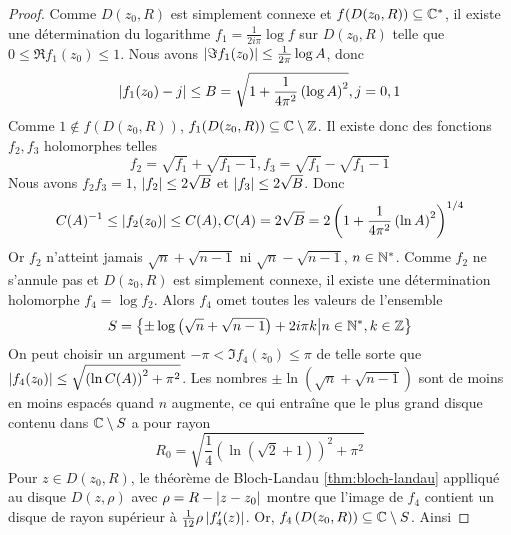 \documentclass{cours}
\begin{document}
\begin{proof}
	Comme $D(z_{0}, R)$ est simplement connexe et $f(D(z_{0}, R)) \subseteq \mathbb{C}^{*}$, il existe une détermination du logarithme $f_{1} = \frac{1}{2i\pi}\log f$ sur $D(z_{0}, R)$ telle que $0 \leq \Re f_{1}(z_{0}) \leq 1$. 
	Nous avons $\left|\Im f_{1}(z_{0})\right| \leq \frac{1}{2\pi}\log A$, donc
	\begin{equation*}
		\left|f_{1}(z_{0}) - j\right| \leq B = \sqrt{1 + \frac{1}{4\pi^{2}}\left(\log A\right)^{2}}, j = 0, 1
	\end{equation*}
	Comme $1 \notin f(D(z_{0}, R))$, $f_{1}(D(z_{0}, R)) \subseteq \mathbb{C} \setminus \mathbb{Z}$. 
	Il existe donc des fonctions $f_{2}, f_{3}$ holomorphes telles
	\begin{equation*}
		f_{2} = \sqrt{f_{1}} + \sqrt{f_{1} - 1}, f_{3} = \sqrt{f_{1}} - \sqrt{f_{1}-1}
	\end{equation*}
	Nous avons $f_{2}f_{3} = 1$, $\left|f_{2}\right|\leq 2\sqrt{B}$ et $\left|f_{3}\right|\leq 2\sqrt{B}$. Donc
	\begin{equation*}
		C(A)^{-1} \leq \left|f_{2}(z_{0})\right| \leq C(A), C(A) = 2\sqrt{B} = 2\left(1 + \frac{1}{4\pi^{2}}\left(\ln A\right)^{2}\right)^{1/4}
	\end{equation*}
	Or $f_{2}$ n'atteint jamais $\sqrt{n} + \sqrt{n - 1}$ ni $\sqrt{n} - \sqrt{n - 1}$, $n \in \mathbb{N}^{*}$. 
	Comme $f_{2}$ ne s'annule pas et $D(z_{0}, R)$ est simplement connexe, il existe une détermination holomorphe $f_{4} = \log f_{2}$.
	Alors $f_{4}$ omet toutes les valeurs de l'ensemble 
	\begin{equation*}
		S = \left\{\pm \log\left(\sqrt{n} + \sqrt{n - 1}\right) + 2i\pi k\middle| n \in \mathbb{N}^{*}, k \in \mathbb{Z}\right\}
	\end{equation*}
	On peut choisir un argument $-\pi < \Im f_{4}(z_{0}) \leq \pi$ de telle sorte que $\left|f_{4}(z_{0})\right| \leq\sqrt{\left(\ln C(A)\right)^{2} + \pi^{2}}$.
	Les nombres $\pm \ln\left(\sqrt{n} + \sqrt{n - 1}\right)$ sont de moins en moins espacés quand $n$ augmente, ce qui entraîne que le plus grand disque contenu dans $\mathbb{C} \setminus S$ a pour rayon
	\begin{equation*}
		R_{0} = \sqrt{\frac{1}{4}\left(\ln(\sqrt{2} + 1)\right)^{2} + \pi^{2}}
	\end{equation*}
	Pour $z \in D(z_{0}, R)$, le théorème de Bloch-Landau \ref{thm:bloch-landau} applliqué au disque $D(z, \rho)$ avec $\rho = R - \left|z - z_{0}\right|$ montre que l'image de $f_{4}$ contient un disque de rayon supérieur à $\frac{1}{12}\rho\left|f_{4}'(z)\right|$. 
	Or, $f_{4}\left(D(z_{0}, R)\right) \subseteq \mathbb{C} \setminus S$. Ainsi

\end{proof}
\end{document}

